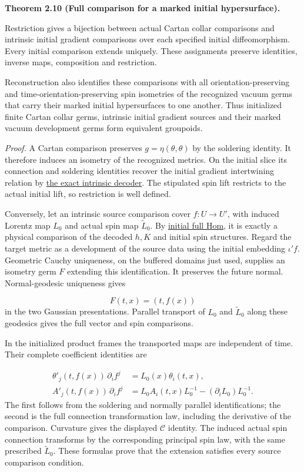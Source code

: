 \documentclass[
  english,
  11pt,
  reqno]{amsart}
\makeatletter
\newcommand{\pandocstatementheading}[1]{%
  \par\addpenalty{\@beginparpenalty}%
  \addvspace{.5\baselineskip plus .2\baselineskip minus .2\baselineskip}%
  {\normalfont\bfseries #1\par}%
  \nobreak\@afterindenttrue\@afterheading
}
\makeatother
\begin{document}
\pandocstatementheading{\leavevmode{}\label{thm:online-marked-collar-full-hom}Theorem 2.10 (Full comparison for a marked initial hypersurface).}

Restriction gives a bijection between actual Cartan collar comparisons
and intrinsic initial gradient comparisons over each specified initial
diffeomorphism. Every initial comparison extends uniquely. These
assignments preserve identities, inverse maps, composition and
restriction.

Reconstruction also identifies these comparisons with all
orientation-preserving and time-orientation-preserving spin isometries
of the recognized vacuum germs that carry their marked initial
hypersurfaces to one another. Thus initialized finite Cartan collar
germs, intrinsic initial gradient sources and their marked vacuum
development germs form equivalent groupoids.

\emph{Proof.} A Cartan comparison preserves \(g=\eta(\theta,\theta)\) by
the soldering identity. It therefore induces an isometry of the
recognized metrics. On the initial slice its connection and soldering
identities recover the initial gradient intertwining relation by
\hyperref[lem:online-intrinsic-gradient-decoder]{the exact intrinsic
decoder}. The stipulated spin lift restricts to the actual initial lift,
so restriction is well defined.

Conversely, let an intrinsic source comparison cover \(f:U\to U'\), with
induced Lorentz map \(L_0\) and actual spin map \(\widetilde L_0\). By
\hyperref[thm:online-initial-gradient-full-hom]{initial full Hom}, it is
exactly a physical comparison of the decoded \(h,K\) and initial spin
structures. Regard the target metric as a development of the source data
using the initial embedding \(\iota'f\). Geometric Cauchy uniqueness, on
the buffered domains just used, supplies an isometry germ \(F\)
extending this identification. It preserves the future normal.
Normal-geodesic uniqueness gives

\label{eq:online-cartan-comparison-gaussian-point-map} \[
F(t,x)=(t,f(x))
\] in the two Gaussian presentations. Parallel transport of \(L_0\) and
\(\widetilde L_0\) along these geodesics gives the full vector and spin
comparisons.

In the initialized product frames the transported maps are independent
of time. Their complete coefficient identities are

\label{eq:online-cartan-comparison-full-coefficients} \[
\begin{aligned}
\theta'_j(t,f(x))\,\partial_i f^j
&=L_0(x)\theta_i(t,x),\\
A'_j(t,f(x))\,\partial_i f^j
&=L_0A_i(t,x)L_0^{-1}
-(\partial_iL_0)L_0^{-1}.
\end{aligned}
\] The first follows from the soldering and normally parallel
identifications; the second is the full connection transformation law,
including the derivative of the comparison. Curvature gives the
displayed \(\mathcal C\) identity. The induced actual spin connection
transforms by the corresponding principal spin law, with the same
prescribed \(\widetilde L_0\). These formulas prove that the extension
satisfies every source comparison condition.
\end{document}
